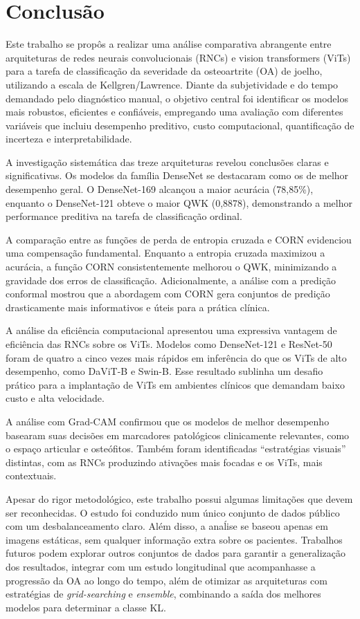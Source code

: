 \chapter{Conclusão}\label{cap:conclusao}

Este trabalho se propôs a realizar uma análise comparativa abrangente entre arquiteturas de redes neurais convolucionais (RNCs) e vision transformers (ViTs) para a tarefa de classificação da severidade da osteoartrite (OA) de joelho, utilizando a escala de Kellgren/Lawrence. Diante da subjetividade e do tempo demandado pelo diagnóstico manual, o objetivo central foi identificar os modelos mais robustos, eficientes e confiáveis, empregando uma avaliação com diferentes variáveis que incluiu desempenho preditivo, custo computacional, quantificação de incerteza e interpretabilidade.

A investigação sistemática das treze arquiteturas revelou conclusões claras e significativas. Os modelos da família DenseNet se destacaram como os de melhor desempenho geral. O DenseNet-169 alcançou a maior acurácia (78,85\%), enquanto o DenseNet-121 obteve o maior QWK (0,8878), demonstrando a melhor performance preditiva na tarefa de classificação ordinal.

A comparação entre as funções de perda de entropia cruzada e CORN evidenciou uma compensação fundamental. Enquanto a entropia cruzada maximizou a acurácia, a função CORN consistentemente melhorou o QWK, minimizando a gravidade dos erros de classificação. Adicionalmente, a análise com a predição conformal mostrou que a abordagem com CORN gera conjuntos de predição drasticamente mais informativos e úteis para a prática clínica.

A análise da eficiência computacional apresentou uma expressiva vantagem de eficiência das RNCs sobre os ViTs. Modelos como DenseNet-121 e ResNet-50 foram de quatro a cinco vezes mais rápidos em inferência do que os ViTs de alto desempenho, como DaViT-B e Swin-B. Esse resultado sublinha um desafio prático para a implantação de ViTs em ambientes clínicos que demandam baixo custo e alta velocidade.

A análise com Grad-CAM confirmou que os modelos de melhor desempenho basearam suas decisões em marcadores patológicos clinicamente relevantes, como o espaço articular e osteófitos. Também foram identificadas ``estratégias visuais'' distintas, com as RNCs produzindo ativações mais focadas e os ViTs, mais contextuais.

Apesar do rigor metodológico, este trabalho possui algumas limitações que devem ser reconhecidas. O estudo foi conduzido num único conjunto de dados público com um desbalanceamento claro. Além disso, a anaĺise se baseou apenas em imagens estáticas, sem qualquer informação extra sobre os pacientes. Trabalhos futuros podem explorar outros conjuntos de dados para garantir a generalização dos resultados, integrar com um estudo longitudinal que acompanhasse a progressão da OA ao longo do tempo, além de otimizar as arquiteturas com estratégias de \textit{grid-searching} e \textit{ensemble}, combinando a saída dos melhores modelos para determinar a classe KL.

